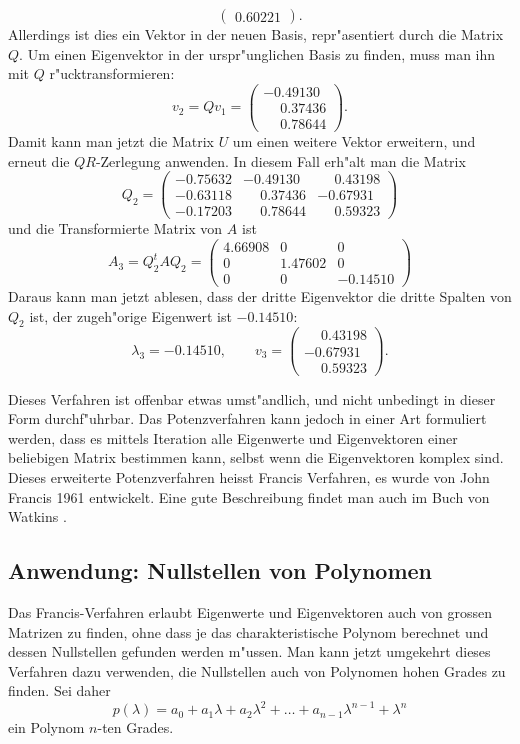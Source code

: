 \begin{beispiel}
\[\begin{pmatrix}
   0.60221
\end{pmatrix}.
\]
Allerdings ist dies ein Vektor in der neuen Basis, repr"asentiert durch
die Matrix $Q$.
Um einen Eigenvektor in der urspr"unglichen Basis zu finden, muss man ihn
mit $Q$ r"ucktransformieren:
\[
v_2=Qv_1=\begin{pmatrix}
          -0.49130\\
\phantom{-}0.37436\\
\phantom{-}0.78644
\end{pmatrix}.
\]
Damit kann man jetzt die Matrix $U$ um einen weitere Vektor erweitern,
und erneut die $QR$-Zerlegung anwenden. In diesem Fall erh"alt man die
Matrix
\[
Q_2=\begin{pmatrix}
-0.75632&          -0.49130&\phantom{-}0.43198\\
-0.63118&\phantom{-}0.37436&          -0.67931\\
-0.17203&\phantom{-}0.78644&\phantom{-}0.59323
\end{pmatrix}
\]
und die Transformierte Matrix von $A$ ist
\[
A_3 = Q_2^tAQ_2=\begin{pmatrix}
   4.66908 & 0       & 0      \\
   0       & 1.47602 & 0      \\
   0       & 0       &-0.14510
\end{pmatrix}
\]
Daraus kann man jetzt ablesen, dass der dritte Eigenvektor
die dritte Spalten von $Q_2$ ist, der zugeh"orige Eigenwert ist
$-0.14510$:
\[
\lambda_3 = -0.14510,\qquad
v_3=
\begin{pmatrix}
\phantom{-}0.43198\\
          -0.67931\\
\phantom{-}0.59323
\end{pmatrix}.
\]
\end{beispiel}


Dieses Verfahren ist offenbar etwas umst"andlich, und nicht unbedingt
in dieser Form durchf"uhrbar.
Das Potenzverfahren kann jedoch in einer Art formuliert werden, dass
es mittels Iteration alle Eigenwerte und Eigenvektoren einer beliebigen
Matrix bestimmen kann, selbst wenn die Eigenvektoren komplex sind.
Dieses erweiterte Potenzverfahren heisst Francis Verfahren, es
wurde von John Francis 1961 entwickelt.
Eine gute Beschreibung findet man auch im Buch von Watkins
\cite[Chapter 5]{skript:watkins}.

\subsection{Anwendung: Nullstellen von Polynomen}
Das Francis-Verfahren erlaubt Eigenwerte und Eigenvektoren auch
von grossen Matrizen zu finden, ohne dass je das charakteristische
Polynom berechnet und dessen Nullstellen gefunden werden m"ussen.
Man kann jetzt umgekehrt dieses Verfahren dazu verwenden, die Nullstellen
auch von Polynomen hohen Grades zu finden. Sei daher
\begin{equation}
p(\lambda)=a_0+a_1\lambda+a_2\lambda^2+\dots + a_{n-1}\lambda^{n-1}+\lambda^n
\label{polynomnullstellen:p}
\end{equation}
ein Polynom $n$-ten Grades.

